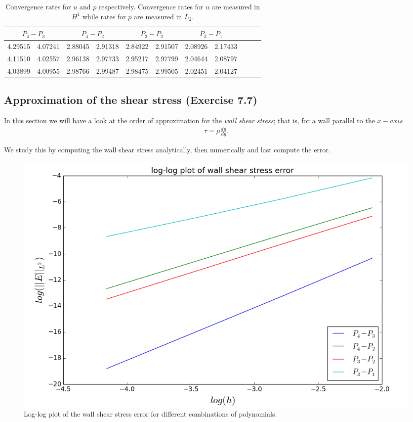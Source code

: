 \documentclass[11pt,a4paper,english]{article}
\numberwithin{equation}{section}
\begin{document}
\begin{table}[H]
\centering
\caption{Convergence rates for $u$ and $p$ respectively. Convergence rates for $u$ are measured in $H^1$ while rates for $p$ are measured in $L_2$.}
\vspace{3mm}
\begin{tabular}{|l|l|l|l|l|l|l|l|l|l|l|}
\hline
 \multicolumn{2}{|c|}{ $P_4-P_3$} &  \multicolumn{2}{|c|}{ $P_4-P_2$} &  \multicolumn{2}{|c|}{ $P_3-P_2$} &  \multicolumn{2}{|c|}{ $P_3-P_1$} \\
\hline
4.29515 & 4.07241 & 2.88045 & 2.91318 & 2.84922 & 2.91507 & 2.08926 & 2.17433 \\
\hline
4.11510 & 4.02557 & 2.96138 & 2.97733 & 2.95217 & 2.97799 & 2.04644 & 2.08797 \\
\hline
4.03899 & 4.00955 & 2.98766 & 2.99487 & 2.98475 & 2.99505 & 2.02451 & 2.04127 \\
\hline
\end{tabular}
\end{table}


\newpage 

\subsection{Approximation of the shear stress (Exercise 7.7)}

In this section we will have a look at the order of approximation for the \emph{wall shear stress}; that is, for a wall parallel to the $x-axis$ 
\begin{align*}
\tau = \mu \frac{du}{dy}.
\end{align*}

We study this by computing the wall shear stress analytically, then numerically and last compute the error. 

\begin{figure}[h!] 
\begin{center}
  \includegraphics[scale=0.3]{shear_loglog.png}
  \end{center}
  \caption{Log-log plot of the wall shear stress error for different combinations of polynomials.}
   \label{fig:shearstress}
\end{figure}
\end{document}

